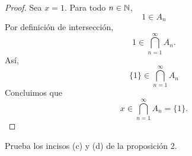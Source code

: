 \documentclass[12pt,a4paper]{article}
\begin{document}
\begin{proof}
        Sea $x=1$. Para todo $n\in\mathbb{N}$,
        \begin{equation*}
            1\in A_{n}
        \end{equation*}
        Por definición de intersección,
        \begin{equation*}
            1\in\bigcap_{n=1}^{\infty}A_{n}.
        \end{equation*}
        Así,
        \begin{equation*}
            \{1\}\in\bigcap_{n=1}^{\infty}A_{n}
        \end{equation*}
        Concluimos que
        \begin{equation*}
            x\in\bigcap_{n=1}^{\infty}A_{n}=\{1\}.
        \end{equation*}
    \end{proof}

    \begin{problema}
        Prueba los incisos (c) y (d) de la proposición 2.
    \end{problema}
\end{document}
